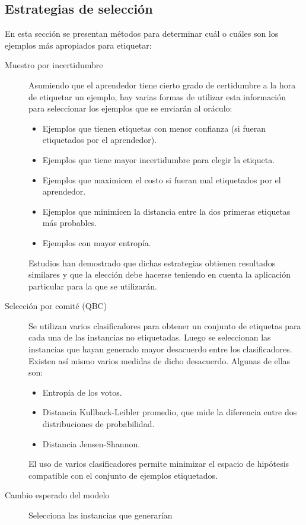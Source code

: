 \documentclass[11pt,spanish]{article}
\begin{document}
\subsection{Estrategias de selección}
En esta sección se presentan métodos para determinar cuál o cuáles son los
ejemplos más apropiados para etiquetar:
\begin{description}
    \item[Muestro por incertidumbre] Asumiendo que el aprendedor tiene cierto
    grado de certidumbre a la hora de etiquetar un ejemplo, hay varias formas
    de utilizar esta información para seleccionar los ejemplos que se enviarán
    al oráculo:
    \begin{itemize}
        \item Ejemplos que tienen etiquetas con menor confianza (si fueran
        etiquetados por el aprendedor).
        \item Ejemplos que tiene mayor incertidumbre para elegir la etiqueta.
        \item Ejemplos que maximicen el costo si fueran mal etiquetados por
        el aprendedor.
        \item Ejemplos que minimicen la distancia entre la dos primeras
        etiquetas más probables.
        \item Ejemplos con mayor entropía.
    \end{itemize}
    Estudios han demostrado que dichas estrategias obtienen resultados similares
    y que la elección debe hacerse teniendo en cuenta la aplicación particular
    para la que se utilizarán.
    \item[Selección por comité (QBC)] Se utilizan varios clasificadores para obtener
    un conjunto de etiquetas para cada una de las instancias no etiquetadas.
    Luego se seleccionan las instancias que hayan generado mayor desacuerdo
    entre los clasificadores. Existen así mismo varios medidas de dicho
    desacuerdo. Algunas de ellas son:
    \begin{itemize}
        \item Entropía de los votos.
        \item Distancia Kullback-Leibler promedio, que mide la diferencia entre
        dos distribuciones de probabilidad.
        \item Distancia Jensen-Shannon.
    \end{itemize}
    El uso de varios clasificadores permite minimizar el espacio de hipótesis
    compatible con el conjunto de ejemplos etiquetados.
    \item[Cambio esperado del modelo] Selecciona las instancias que generarían

\end{description}
\end{document}
